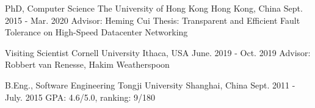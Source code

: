 

\begin{cventries}


\cventry
{PhD, Computer Science} %
{The University of Hong Kong} %
{Hong Kong, China} %
{Sept. 2015 - Mar. 2020} %
{ %
Advisor: Heming Cui\newline
Thesis: Transparent and Efficient Fault Tolerance on High-Speed Datacenter Networking
}


\cventry
{Visiting Scientist} %
{Cornell University} %
{Ithaca, USA} %
{June. 2019 - Oct. 2019} %
{ %
Advisor: Robbert van Renesse, Hakim Weatherspoon
}


\cventry
{B.Eng., Software Engineering} %
{Tongji University} %
{Shanghai, China} %
{Sept. 2011 - July. 2015} %
{ %
GPA: 4.6/5.0, ranking: 9/180
}

\end{cventries}
